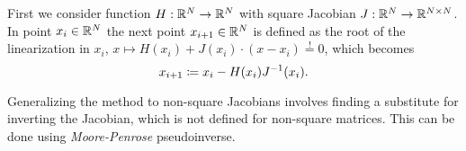 First we consider function $H: \mathbb{R}^N \to \mathbb{R}^N$ with square Jacobian $J: \mathbb{R}^N \to \mathbb{R}^{N \times N}$.
In point $x_i \in \mathbb{R}^N$ the next point $x_{i+1} \in \mathbb{R}^N$ is defined as the root of the linearization in $x_i$, $x \mapsto H(x_i) + J(x_i) \cdot (x - x_i) \stackrel!= 0$, which becomes
	\[
		x_{i+1} \coloneqq x_i - H(x_i) J^{-1}(x_i) \text.
	\]

Generalizing the method to non-square Jacobians involves finding a substitute for inverting the Jacobian, which is not defined for non-square matrices.
This can be done using \emph{Moore-Penrose} pseudoinverse.



